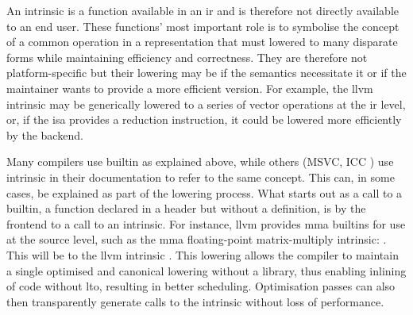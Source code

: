 \documentclass[\main/thesis.tex]{subfiles}
\begin{document}
An \gls{intrinsic} is a function available in an \gls{ir} and is therefore not directly available to an end user.
These functions' most important role is to symbolise the concept of a common operation in a representation that must lowered to many disparate forms while maintaining efficiency and correctness.
They are therefore not platform-specific but their lowering may be if the semantics necessitate it or if the maintainer wants to provide a more efficient version.
For example, the \gls{llvm} \gls{intrinsic}  may be generically lowered to a series of vector operations at the \gls{ir} level, or, if the \gls{isa} provides a reduction instruction, it could be lowered more efficiently by the backend.

Many compilers use \gls{builtin} as explained above, while others (\eg MSVC, ICC  ) use \gls{intrinsic} in their documentation to refer to the same concept.
This can, in some cases, be explained as part of the lowering process.
What starts out as a call to a \gls{builtin}, a function declared in a header but without a definition, is  by the frontend to a call to an intrinsic.
For instance, \gls{llvm} provides \gls{mma} \glspl{builtin} for use at the source level, such as the \gls{mma} floating-point matrix-multiply intrinsic: .
This will be  to the \gls{llvm} \gls{intrinsic} .
This \gls{lowering} allows the compiler to maintain a single optimised and canonical lowering without a library, thus enabling inlining of code without \gls{lto}, resulting in better scheduling.
Optimisation passes can also then transparently generate calls to the intrinsic without loss of performance.
\end{document}
